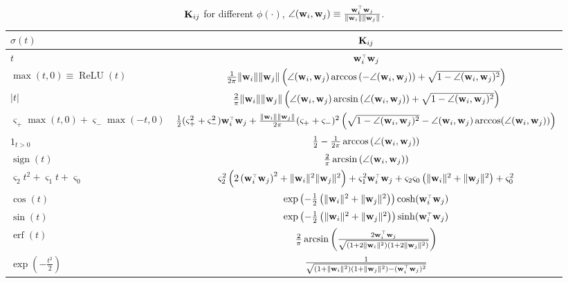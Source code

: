 \documentclass[11pt]{article}
\DeclareMathOperator{\ReLU}{ReLU}
\DeclareMathOperator{\sign}{sign}
\DeclareMathOperator{\erf}{erf}
\begin{document}
\begin{table}[t]
\caption{$\mathbf K_{ij}$ for different $\phi(\cdot)$, $\angle(\w_i,\w_j) \equiv \frac{\w_i^\top \w_j}{\|\w_i\| \|\w_j\|}$.}
\label{tab:K-phi}
\begin{center}
\begin{tabular}{l|c}
\hline
$\sigma(t)$     & $\mathbf K_{ij}$ \\
\hline
$t$    & $\w_i^\top \w_j$\\

$\max(t,0) \equiv \ReLU(t)$     & $\frac1{2\pi} \|\mathbf w_i\| \|\mathbf w_j\| \left(\angle(\mathbf w_i,\mathbf w_j)\arccos\left(-\angle(\mathbf w_i,\mathbf w_j)\right)+\sqrt{1-\angle(\mathbf w_i,\mathbf w_j)^2}\right)$   \\

$|t|$           & $\frac2\pi \|\mathbf w_i\| \|\mathbf w_j\| \left(\angle(\mathbf w_i,\mathbf w_j)\arcsin\left(\angle(\mathbf w_i,\mathbf w_j)\right)+\sqrt{1-\angle(\mathbf w_i,\mathbf w_j)^2}\right)$   \\

$\varsigma_+ \max(t,0)+ \varsigma_- \max(-t,0)$ & $ \frac12 (\varsigma_+^2 + \varsigma_-^2) \w_i^\top\w_j + \frac{\|\w_i\| \|\w_j\|}{2\pi} (\varsigma_+ + \varsigma_-)^2 \left( \sqrt{1 - \angle(\w_i,\w_j)^2 } - \angle(\w_i,\w_j) \arccos(\angle(\w_i,\w_j)) \right) $\\

$1_{t>0}$       & $\frac12 -\frac1{2\pi} \arccos\left(\angle(\mathbf w_i,\mathbf w_j)\right)$    \\

$\sign(t)$ & $\frac2\pi\arcsin\left(\angle(\mathbf w_i,\mathbf w_j)\right)$    \\

$\varsigma_2 t^2 + \varsigma_1 t + \varsigma_0$ & $\varsigma_2^2 \left( 2\left( \w_i^\top \w_j \right)^2 + \|\w_i\|^2 \|\w_j\|^2 \right) + \varsigma_1^2 \w_i^\top \w_j + \varsigma_2 \varsigma_0 \left( \|\w_i\|^2 + \|\w_j\|^2 \right) + \varsigma_0^2$\\

$\cos(t)$       & $\exp\left(-\frac12 \left(\|\w_i\|^2 + \|\w_j\|^2\right)\right) \cosh(\w_i^\top \w_j)$  \\

$\sin(t)$       & $\exp\left(-\frac12 \left(\|\w_i\|^2 + \|\w_j\|^2\right)\right) \sinh(\w_i^\top \w_j)$  \\

$\erf(t)$  & $\frac2\pi \arcsin\left(\frac{2\w_i^\top \w_j}{\sqrt{(1+2\|\w_i\|^2)(1+2\|\w_j\|^2)}}\right)$    \\
$\exp(-\frac{t^2}2)$ & $\frac1{ \sqrt{ (1+\|\w_i\|^2) (1+\|\w_j\|^2) - (\w_i^\top \w_j)^2 } }$\\
\hline
\end{tabular}
\end{center}
\end{table}
\end{document}
